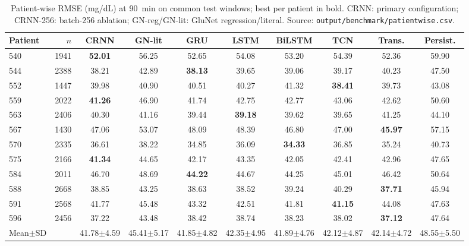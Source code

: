 \begin{table}[t]\centering
\caption{Patient-wise RMSE (mg/dL) at 90~min on common test windows; best per patient in bold. CRNN: primary configuration; CRNN-256: batch-256 ablation; GN-reg/GN-lit: GluNet regression/literal. Source: \texttt{output/benchmark/patientwise.csv}.}
\scriptsize\setlength{\tabcolsep}{3pt}
\begin{tabular}{lrcccccccc}\toprule
Patient & $n$ & CRNN & GN-lit & GRU & LSTM & BiLSTM & TCN & Trans. & Persist.\\\midrule
540 & 1941 & \textbf{52.01} & 56.25 & 52.65 & 54.08 & 53.20 & 54.39 & 52.36 & 59.90\\
544 & 2388 & 38.21 & 42.89 & \textbf{38.13} & 39.65 & 39.06 & 39.17 & 40.23 & 47.50\\
552 & 1447 & 39.98 & 40.90 & 40.51 & 40.27 & 41.32 & \textbf{38.41} & 39.73 & 43.08\\
559 & 2022 & \textbf{41.26} & 46.90 & 41.74 & 42.75 & 42.77 & 43.06 & 42.62 & 50.60\\
563 & 2406 & 40.30 & 41.16 & 39.44 & \textbf{39.18} & 39.62 & 39.65 & 41.25 & 44.10\\
567 & 1430 & 47.06 & 53.07 & 48.09 & 48.39 & 46.80 & 47.00 & \textbf{45.97} & 57.15\\
570 & 2335 & 36.61 & 38.22 & 34.85 & 36.09 & \textbf{34.33} & 36.85 & 35.24 & 40.73\\
575 & 2166 & \textbf{41.34} & 44.65 & 42.17 & 43.35 & 42.05 & 42.41 & 42.96 & 47.65\\
584 & 2011 & 46.70 & 48.69 & \textbf{44.22} & 44.67 & 44.25 & 45.01 & 46.42 & 50.64\\
588 & 2668 & 38.85 & 43.25 & 38.63 & 38.52 & 39.24 & 40.29 & \textbf{37.71} & 45.94\\
591 & 2568 & 41.77 & 45.48 & 43.32 & 42.51 & 41.81 & \textbf{41.15} & 44.08 & 47.63\\
596 & 2456 & 37.22 & 43.48 & 38.42 & 38.74 & 38.23 & 38.02 & \textbf{37.12} & 47.64\\
\midrule
Mean$\pm$SD & & 41.78$\pm$4.59 & 45.41$\pm$5.17 & 41.85$\pm$4.82 & 42.35$\pm$4.95 & 41.89$\pm$4.76 & 42.12$\pm$4.87 & 42.14$\pm$4.72 & 48.55$\pm$5.50\\
\bottomrule
\end{tabular}\end{table}
